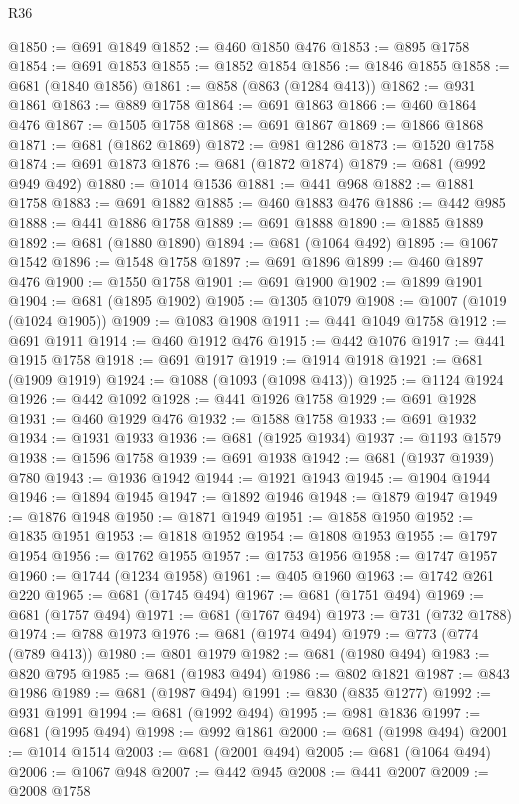 \begin{lexlean}{R36}
\begin{coremodule}
@1850 := @691 @1849
@1852 := @460 @1850 @476
@1853 := @895 @1758
@1854 := @691 @1853
@1855 := @1852 @1854
@1856 := @1846 @1855
@1858 := @681 (@1840 @1856)
@1861 := @858 (@863 (@1284 @413))
@1862 := @931 @1861
@1863 := @889 @1758
@1864 := @691 @1863
@1866 := @460 @1864 @476
@1867 := @1505 @1758
@1868 := @691 @1867
@1869 := @1866 @1868
@1871 := @681 (@1862 @1869)
@1872 := @981 @1286
@1873 := @1520 @1758
@1874 := @691 @1873
@1876 := @681 (@1872 @1874)
@1879 := @681 (@992 @949 @492)
@1880 := @1014 @1536
@1881 := @441 @968
@1882 := @1881 @1758
@1883 := @691 @1882
@1885 := @460 @1883 @476
@1886 := @442 @985
@1888 := @441 @1886 @1758
@1889 := @691 @1888
@1890 := @1885 @1889
@1892 := @681 (@1880 @1890)
@1894 := @681 (@1064 @492)
@1895 := @1067 @1542
@1896 := @1548 @1758
@1897 := @691 @1896
@1899 := @460 @1897 @476
@1900 := @1550 @1758
@1901 := @691 @1900
@1902 := @1899 @1901
@1904 := @681 (@1895 @1902)
@1905 := @1305 @1079
@1908 := @1007 (@1019 (@1024 @1905))
@1909 := @1083 @1908
@1911 := @441 @1049 @1758
@1912 := @691 @1911
@1914 := @460 @1912 @476
@1915 := @442 @1076
@1917 := @441 @1915 @1758
@1918 := @691 @1917
@1919 := @1914 @1918
@1921 := @681 (@1909 @1919)
@1924 := @1088 (@1093 (@1098 @413))
@1925 := @1124 @1924
@1926 := @442 @1092
@1928 := @441 @1926 @1758
@1929 := @691 @1928
@1931 := @460 @1929 @476
@1932 := @1588 @1758
@1933 := @691 @1932
@1934 := @1931 @1933
@1936 := @681 (@1925 @1934)
@1937 := @1193 @1579
@1938 := @1596 @1758
@1939 := @691 @1938
@1942 := @681 (@1937 @1939) @780
@1943 := @1936 @1942
@1944 := @1921 @1943
@1945 := @1904 @1944
@1946 := @1894 @1945
@1947 := @1892 @1946
@1948 := @1879 @1947
@1949 := @1876 @1948
@1950 := @1871 @1949
@1951 := @1858 @1950
@1952 := @1835 @1951
@1953 := @1818 @1952
@1954 := @1808 @1953
@1955 := @1797 @1954
@1956 := @1762 @1955
@1957 := @1753 @1956
@1958 := @1747 @1957
@1960 := @1744 (@1234 @1958)
@1961 := @405 @1960
@1963 := @1742 @261 @220
@1965 := @681 (@1745 @494)
@1967 := @681 (@1751 @494)
@1969 := @681 (@1757 @494)
@1971 := @681 (@1767 @494)
@1973 := @731 (@732 @1788)
@1974 := @788 @1973
@1976 := @681 (@1974 @494)
@1979 := @773 (@774 (@789 @413))
@1980 := @801 @1979
@1982 := @681 (@1980 @494)
@1983 := @820 @795
@1985 := @681 (@1983 @494)
@1986 := @802 @1821
@1987 := @843 @1986
@1989 := @681 (@1987 @494)
@1991 := @830 (@835 @1277)
@1992 := @931 @1991
@1994 := @681 (@1992 @494)
@1995 := @981 @1836
@1997 := @681 (@1995 @494)
@1998 := @992 @1861
@2000 := @681 (@1998 @494)
@2001 := @1014 @1514
@2003 := @681 (@2001 @494)
@2005 := @681 (@1064 @494)
@2006 := @1067 @948
@2007 := @442 @945
@2008 := @441 @2007
@2009 := @2008 @1758

\end{coremodule}
\end{lexlean}
